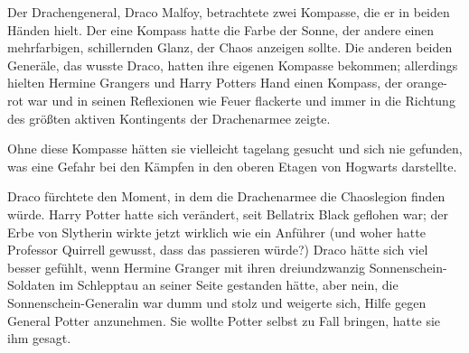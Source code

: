 Der Drachengeneral, Draco Malfoy, betrachtete zwei Kompasse, die er in beiden Händen hielt. Der eine Kompass hatte die Farbe der Sonne, der andere einen mehrfarbigen, schillernden Glanz, der Chaos anzeigen sollte. Die anderen beiden Generäle, das wusste Draco, hatten ihre eigenen Kompasse bekommen; allerdings hielten Hermine Grangers und Harry Potters Hand einen Kompass, der orange-rot war und in seinen Reflexionen wie Feuer flackerte und immer in die Richtung des größten aktiven Kontingents der Drachenarmee zeigte.

Ohne diese Kompasse hätten sie vielleicht tagelang gesucht und sich nie gefunden, was eine Gefahr bei den Kämpfen in den oberen Etagen von Hogwarts darstellte.

Draco fürchtete den Moment, in dem die Drachenarmee die Chaoslegion finden würde. Harry Potter hatte sich verändert, seit Bellatrix Black geflohen war; der Erbe von Slytherin wirkte jetzt wirklich wie ein Anführer (und woher hatte Professor Quirrell gewusst, dass das passieren würde?) Draco hätte sich viel besser gefühlt, wenn Hermine Granger mit ihren dreiundzwanzig Sonnenschein-Soldaten im Schlepptau an seiner Seite gestanden hätte, aber nein, die Sonnenschein-Generalin war dumm und stolz und weigerte sich, Hilfe gegen General Potter anzunehmen. Sie wollte Potter selbst zu Fall bringen, hatte sie ihm gesagt.

